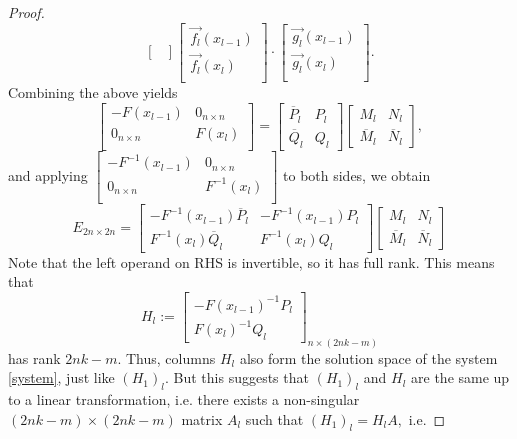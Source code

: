 \documentclass[11pt,reqno,oneside,a4paper]{article}
\theoremstyle{plain} %
\theoremstyle{definition}
\theoremstyle{remark}
\begin{document}
\begin{proof}
\[\begin{bmatrix}
\end{bmatrix}
\begin{bmatrix}
\vec{f_l}(x_{l-1})  \\
\vec{f_l}(x_{l})  \\
\end{bmatrix}
\cdot
\begin{bmatrix}
\vec{g_l}(x_{l-1})  \\
\vec{g_l}(x_{l})  \\
\end{bmatrix}.\]
Combining the above yields
\[ 
\begin{bmatrix}
- F(x_{l-1}) & 0_{n\times n} \\
0_{n\times n} &  F(x_{l}) \\
\end{bmatrix} = 
\begin{bmatrix}
\overline{P}_l & P_l \\
\overline{Q}_l & Q_l 
\end{bmatrix} 
\begin{bmatrix}
M_l & N_l  \\
\overline{M}_l & \overline{N}_l 
\end{bmatrix},
\]
and applying $\begin{bmatrix}
- F^{-1}(x_{l-1}) & 0_{n\times n} \\
0_{n\times n} &  F^{-1}(x_{l}) \\
\end{bmatrix}$ to both sides, we obtain
\[ 
E_{2n\times 2n}
= 
\begin{bmatrix}
- F^{-1}(x_{l-1})\overline{P}_l & - F^{-1}(x_{l-1})P_l \\
F^{-1}(x_{l}) \overline{Q}_l & F^{-1}(x_{l}) Q_l 
\end{bmatrix} 
\begin{bmatrix}
M_l & N_l  \\
\overline{M}_l & \overline{N}_l 
\end{bmatrix}
\]
Note that the left operand on RHS is invertible, so it has full rank. This means that 
\[ H_l := \begin{bmatrix}
-F(x_{l-1})^{-1} P_l \\
F(x_l)^{-1}Q_l
\end{bmatrix}_{n \times (2nk -m)}
\]
has rank $2nk -m.$ Thus, columns $H_l$ also form the solution space of the system \eqref{system}, just like $(H_1)_l.$ But this suggests that $(H_1)_l$ and $H_l$ are the same up to a linear transformation, i.e. there exists a non-singular $(2nk-m)\times (2nk-m)$ matrix $A_l$ such that $(H_1)_l = H_l A,$ i.e.

\end{proof}
\end{document}
